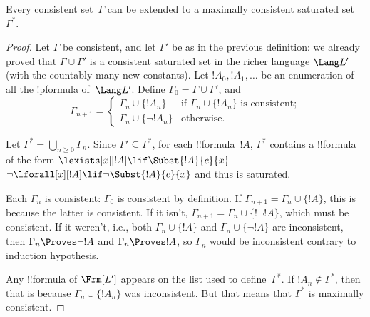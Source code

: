 \documentclass[../../include/open-logic-section]{subfiles}
\begin{document}

\begin{lem}
Every consistent set~$\Gamma$ can be extended to a maximally
consistent saturated set~$\Gamma^*$.
\end{lem}

\begin{proof}
Let $\Gamma$ be consistent, and let $\Gamma'$ be as in the previous
definition: we already proved that $\Gamma \cup \Gamma'$ is a
consistent saturated set in the richer language $\Lang L'$ (with the
countably many new constants). Let $!A_0, !A_1, \dots$ be an
enumeration of all the !p{formula} of~$\Lang L'$. Define $\Gamma_0 =
\Gamma \cup \Gamma'$, and
\[
\Gamma_{n+1} =
\begin{cases}
\Gamma_n \cup \{ !A_n \} & \textrm{if $\Gamma_n \cup \{!A_n\}$ is
  consistent;} \\ 
\Gamma_n \cup \{ \lnot !A_n \} & \textrm{otherwise.}
\end{cases}
\]

Let $\Gamma^* = \bigcup_{n \geq 0} \Gamma_n$. Since $\Gamma' \subseteq
\Gamma^*$, for each !!{formula}~$!A$, $\Gamma^*$ contains a
!!{formula} of the form
{$\lexists[x][!A] \lif \Subst{!A}{c}{x}$}
{$\lnot\lforall[x][!A] \lif \lnot\Subst{!A}{c}{x}$}
and thus is saturated.

Each $\Gamma_n$ is consistent: $\Gamma_0$ is consistent by
definition. If $\Gamma_{n+1} = \Gamma_n \cup \{!A\}$, this is because
the latter is consistent.  If it isn't, $\Gamma_{n+1} = \Gamma_n \cup
\{!\lnot !A\}$, which must be consistent.  If it weren't, i.e., both
$\Gamma_n \cup \{!A\}$ and $\Gamma_n \cup \{\lnot !A\}$ are
inconsistent, then $\Gamma_n \Proves \lnot !A$ and $\Gamma_n \Proves
!A$, so $\Gamma_n$ would be inconsistent contrary to induction
hypothesis.

Any !!{formula} of $\Frm[L']$ appears on the list used to
define~$\Gamma^*$.  If $!A_n \notin \Gamma^*$, then that is because
$\Gamma_n \cup \{!A_n\}$ was inconsistent.  But that means that
$\Gamma^*$ is maximally consistent.
\end{proof}
\end{document}
